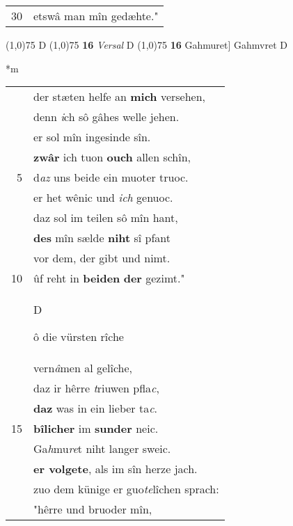 \documentclass[8pt,a4paper,notitlepage]{article}
\begin{document}
\begin{table}[ht]
\begin{minipage}[t]{0.5\linewidth}
\begin{tabular}{rl}
30 & etswâ man mîn gedæhte."\\ 
\end{tabular}
\scriptsize
\line(1,0){75} \newline
D \newline
\line(1,0){75} \newline
\textbf{16} \textit{Versal} D  \newline
\line(1,0){75} \newline
\textbf{16} Gahmuret] Gahmvret D \newline
\end{minipage}
\hspace{0.5cm}
\begin{minipage}[t]{0.5\linewidth}
\small
\begin{center}*m
\end{center}
\begin{tabular}{rl}
 & der stæten helfe an \textbf{mich} versehen,\\ 
 & denn \textit{i}ch sô gâhes welle jehen.\\ 
 & er sol mîn ingesinde sîn.\\ 
 & \textbf{zwâr} ich tuon \textbf{ouch} allen schîn,\\ 
5 & d\textit{az} uns beide ein muoter truoc.\\ 
 & er het wênic und \textit{ich} genuoc.\\ 
 & daz sol im teilen sô mîn hant,\\ 
 & \textbf{des} mîn sælde \textbf{niht} sî pfant\\ 
 & vor dem, der gibt und nimt.\\ 
10 & ûf reht in \textbf{beiden} \textbf{der} gezimt."\\ 
 & \begin{large}D\end{large}ô die vürsten rîche\\ 
 & vern\textit{â}men al gelîche,\\ 
 & daz ir hêrre \textit{t}riuwen pfla\textit{c},\\ 
 & \textbf{daz} was in ein lieber ta\textit{c}.\\ 
15 & \textbf{bîlicher} im \textbf{sunder} neic.\\ 
 & Ga\textit{h}mu\textit{re}t niht langer sweic.\\ 
 & \textbf{er volgete}, als im sîn herze jach.\\ 
 & zuo dem künige er guo\textit{te}lîchen sprach:\\ 
 & "hêrre und bruoder mîn,\\ 

\end{tabular}
\end{minipage}
\end{table}
\end{document}
